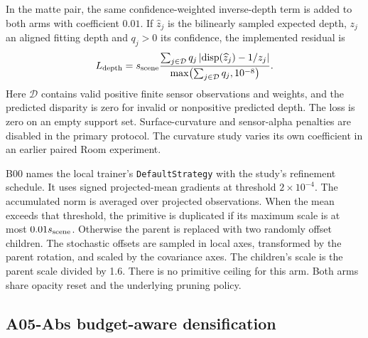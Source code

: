 In the matte pair, the same confidence-weighted inverse-depth term is added to both arms with coefficient $0.01$. If $\widehat z_j$ is the bilinearly sampled expected depth, $z_j$ an aligned fitting depth and $q_j>0$ its confidence, the implemented residual is
\begin{equation}
 L_{\mathrm{depth}}=s_{\rm scene}
  \frac{\sum_{j\in\mathcal D}q_j\left|\operatorname{disp}(\widehat z_j)-1/z_j\right|}
       {\max\bigl(\sum_{j\in\mathcal D}q_j,10^{-8}\bigr)}.
\end{equation}
Here $\mathcal D$ contains valid positive finite sensor observations and weights, and the predicted disparity is zero for invalid or nonpositive predicted depth. The loss is zero on an empty support set. Surface-curvature and sensor-alpha penalties are disabled in the primary protocol. The curvature study varies its own coefficient in an earlier paired Room experiment.

B00 names the local trainer's \texttt{DefaultStrategy} with the study's refinement schedule. It uses signed projected-mean gradients at threshold $2\times10^{-4}$. The accumulated norm is averaged over projected observations. When the mean exceeds that threshold, the primitive is duplicated if its maximum scale is at most $0.01s_{\rm scene}$. Otherwise the parent is replaced with two randomly offset children. The stochastic offsets are sampled in local axes, transformed by the parent rotation, and scaled by the covariance axes. The children's scale is the parent scale divided by 1.6. There is no primitive ceiling for this arm. Both arms share opacity reset and the underlying pruning policy.

\subsection{A05-Abs budget-aware densification}\label{sec:allocation}
